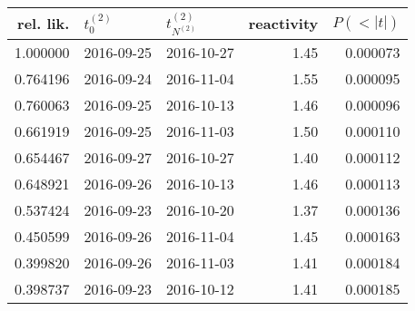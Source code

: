 \begin{tabular}{rllrr}
\toprule
 rel. lik. & $t_0^{(2)}$ & $t^{(2)}_{N^{(2)}}$ & reactivity &  $P(<|t|)$ \\
\midrule
  1.000000 &  2016-09-25 &          2016-10-27 &       1.45 &   0.000073 \\
  0.764196 &  2016-09-24 &          2016-11-04 &       1.55 &   0.000095 \\
  0.760063 &  2016-09-25 &          2016-10-13 &       1.46 &   0.000096 \\
  0.661919 &  2016-09-25 &          2016-11-03 &       1.50 &   0.000110 \\
  0.654467 &  2016-09-27 &          2016-10-27 &       1.40 &   0.000112 \\
  0.648921 &  2016-09-26 &          2016-10-13 &       1.46 &   0.000113 \\
  0.537424 &  2016-09-23 &          2016-10-20 &       1.37 &   0.000136 \\
  0.450599 &  2016-09-26 &          2016-11-04 &       1.45 &   0.000163 \\
  0.399820 &  2016-09-26 &          2016-11-03 &       1.41 &   0.000184 \\
  0.398737 &  2016-09-23 &          2016-10-12 &       1.41 &   0.000185 \\
\bottomrule
\end{tabular}
